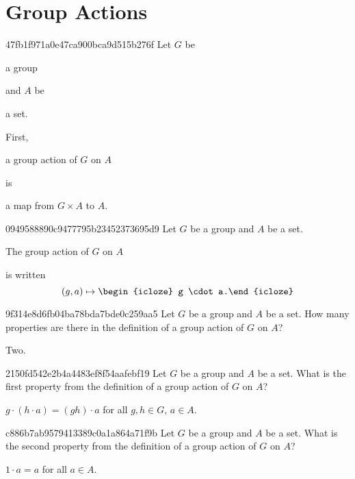 \section{Group Actions}
\begin{note}{47fb1f971a0e47ca900bca9d515b276f}
    Let \({ G }\) be \begin{icloze}{4}a group\end{icloze} and \({ A }\) be \begin{icloze}{3}a set.\end{icloze}
    First, \begin{icloze}{2}a group action of \({ G }\) on \({ A }\)\end{icloze} is \begin{icloze}{1}a map from \({ G \times A }\) to \({ A }\).\end{icloze}
\end{note}

\begin{note}{0949588890c9477795b23452373695d9}
    Let \({ G }\) be a group and \({ A }\) be a set.
    \begin{icloze}{2}The group action of \({ G }\) on \({ A }\)\end{icloze} is written
    \[
        (g, a) \mapsto \begin{icloze}{1}g \cdot a.\end{icloze}
    \]
\end{note}

\begin{note}{9f314e8d6fb04ba78bda7bde0c259aa5}
    Let \({ G }\) be a group and \({ A }\) be a set.
    How many properties are there in the definition of a group action of \({ G }\) on \({ A }\)?

    \begin{cloze}{1}
        Two.
    \end{cloze}
\end{note}

\begin{note}{2150fd542e2b4a4483ef8f54aafebf19}
    Let \({ G }\) be a group and \({ A }\) be a set.
    What is the first property from the definition of a group action of \({ G }\) on \({ A }\)?

    \begin{cloze}{1}
        \({ g \cdot (h \cdot a) = (gh) \cdot a }\) for all \({ g, h \in G }\), \({ a \in A }\).
    \end{cloze}
\end{note}

\begin{note}{c886b7ab9579413389c0a1a864a71f9b}
    Let \({ G }\) be a group and \({ A }\) be a set.
    What is the second property from the definition of a group action of \({ G }\) on \({ A }\)?

    \begin{cloze}{1}
        \({ 1 \cdot a = a }\) for all \({ a \in A }\).
    \end{cloze}
\end{note}

